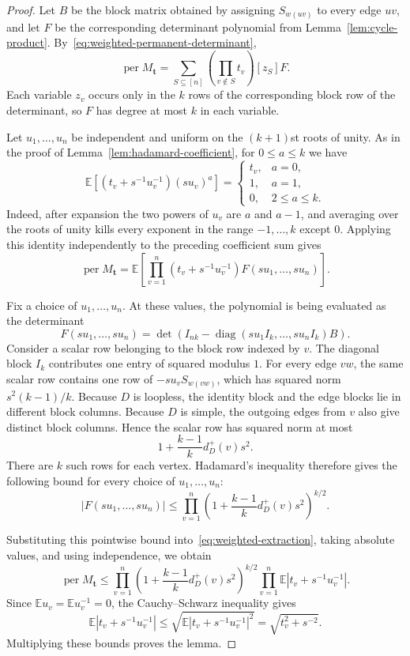 \documentclass[11pt]{amsart}
\theoremstyle{remark}
\newcommand{\per}{\operatorname{per}}
\newcommand{\diag}{\operatorname{diag}}
\begin{document}
\begin{proof}
Let $B$ be the block matrix obtained by assigning $S_{w(uv)}$ to every
edge $uv$, and let $F$ be the corresponding determinant polynomial
from Lemma~\ref{lem:cycle-product}.  By~\eqref{eq:weighted-permanent-determinant},
\[
  \per M_{\mathbf t}
  =
  \sum_{S\subseteq[n]}
  \left(\prod_{v\notin S}t_v\right)[z_S]F.
\]
Each variable $z_v$ occurs only in the $k$ rows of the corresponding
block row of the determinant, so $F$ has degree at most $k$ in each
variable.

Let $u_1,\ldots,u_n$ be independent and uniform on the $(k+1)$st
roots of unity.  As in the proof of
Lemma~\ref{lem:hadamard-coefficient}, for $0\le a\le k$ we have
\[
  \mathbb E\left[(t_v+s^{-1}u_v^{-1})(su_v)^a\right]
  =
  \begin{cases}
    t_v,&a=0,\\
    1,&a=1,\\
    0,&2\le a\le k.
\end{cases}
\]
Indeed, after expansion the two powers of $u_v$ are $a$ and $a-1$,
and averaging over the roots of unity kills every exponent in the
range $-1,\ldots,k$ except $0$.  Applying this identity independently
to the preceding coefficient sum gives
\begin{equation}\label{eq:weighted-extraction}
  \per M_{\mathbf t}
  =\mathbb E\left[
    \prod_{v=1}^n(t_v+s^{-1}u_v^{-1})
    F(su_1,\ldots,su_n)
  \right].
\end{equation}

Fix a choice of $u_1,\ldots,u_n$.  At these values, the polynomial is
being evaluated as the determinant
\[
  F(su_1,\ldots,su_n)
  =
  \det\left(
    I_{nk}-\diag(su_1I_k,\ldots,su_nI_k)B
  \right).
\]
Consider a scalar row belonging to the block row indexed by $v$.  The
diagonal block $I_k$ contributes one entry of squared modulus $1$.
For every edge $vw$, the same scalar row contains one row of
$-su_vS_{w(vw)}$, which has squared norm $s^2(k-1)/k$.
Because $D$ is loopless, the identity block and the edge blocks lie in
different block columns.  Because $D$ is simple, the outgoing edges
from $v$ also give distinct block columns.  Hence the scalar row has
squared norm at most
\[
  1+\frac{k-1}{k}d_D^+(v)s^2.
\]
There are $k$ such rows for each vertex.  Hadamard's inequality
therefore gives the following bound for every choice of
$u_1,\ldots,u_n$:
\[
  |F(su_1,\ldots,su_n)|
  \le
  \prod_{v=1}^n
  \left(1+\frac{k-1}{k}d_D^+(v)s^2\right)^{k/2}.
\]

Substituting this pointwise bound into~\eqref{eq:weighted-extraction},
taking absolute values, and using
independence, we obtain
\[
  \per M_{\mathbf t}
  \le
  \prod_{v=1}^n
  \left(1+\frac{k-1}{k}d_D^+(v)s^2\right)^{k/2}
  \prod_{v=1}^n\mathbb E|t_v+s^{-1}u_v^{-1}|.
\]
Since $\mathbb E u_v=\mathbb E u_v^{-1}=0$, the Cauchy--Schwarz
inequality gives
\[
  \mathbb E|t_v+s^{-1}u_v^{-1}|
  \le
  \sqrt{\mathbb E|t_v+s^{-1}u_v^{-1}|^2}
  =\sqrt{t_v^2+s^{-2}}.
\]
Multiplying these bounds proves the lemma.
\end{proof}
\end{document}
